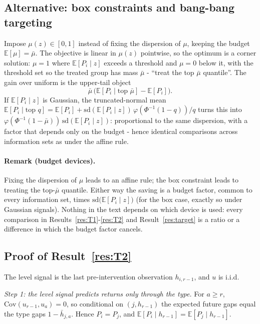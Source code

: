 \documentclass[11pt]{article}
\theoremstyle{remark}
\newcommand{\E}{\mathbb{E}}
\newcommand{\Cov}{\mathrm{Cov}}
\begin{document}
\subsection*{Alternative: box constraints and bang-bang targeting}

Impose $\mu(z)\in[0,1]$ instead of fixing the dispersion of $\mu$, keeping the budget $\E[\mu]=\bar\mu$.
The objective is linear in $\mu(z)$ pointwise, so the optimum is a corner solution: $\mu=1$ where $\E[P_i\mid z]$ exceeds a threshold and $\mu=0$ below it, with the threshold set so the treated group has mass $\bar\mu$ - ``treat the top $\bar\mu$ quantile''.
The gain over uniform is the upper-tail object
\begin{equation}
\bar\mu\,\bigl(\E[P_i\mid\text{top }\bar\mu]-\E[P_i]\bigr).
\end{equation}
If $\E[P_i\mid z]$ is Gaussian, the truncated-normal mean $\E[P_i\mid\text{top }q]=\E[P_i]+\mathrm{sd}(\E[P_i\mid z])\,\varphi(\Phi^{-1}(1-q))/q$ turns this into $\varphi(\Phi^{-1}(1-\bar\mu))\,\mathrm{sd}(\E[P_i\mid z])$: proportional to the same dispersion, with a factor that depends only on the budget - hence identical comparisons across information sets as under the affine rule.

\paragraph{Remark (budget devices).} Fixing the dispersion of $\mu$ leads to an affine
rule; the box constraint leads to treating the top-$\bar\mu$ quantile.
Either way the saving is a budget factor, common to every information set, times $\mathrm{sd}\bigl(\E[P_i\mid z]\bigr)$ (for the box case, exactly so under Gaussian signals).
Nothing in the text depends on which device is used: every comparison in Results~\ref{res:T1}-\ref{res:T2} and Result~\ref{res:target} is a ratio or a difference in which the budget factor cancels.

\subsection*{Proof of Result~\ref{res:T2}}

The level signal is the last pre-intervention observation $h_{i,r-1}$, and $u$ is i.i.d.

\emph{Step 1: the level signal predicts returns only through the type.} For $a\ge r$, $\Cov(u_{r-1},u_a)=0$, so conditional on $(j,h_{r-1})$ the expected future gaps equal the type gaps $1-\bar h_{j,a}$.
Hence $P_i=P_j$, and $\E[P_i\mid h_{r-1}]=\E[P_j\mid h_{r-1}]$.
\end{document}

